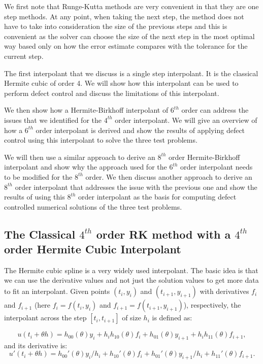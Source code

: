 We first note that Runge-Kutta methods are very convenient in that they are one step methods. At any point, when taking the next step, the method does not have to take into consideration the size of the previous steps and this is convenient as the solver can choose the size of the next step in the most optimal way based only on how the error estimate compares with the tolerance for the current step. 

The first interpolant that we discuss is a single step interpolant. It is the classical Hermite cubic of order 4. We will show how this interpolant can be used to perform defect control and discuss the limitations of this interpolant. 

We then show how a Hermite-Birkhoff interpolant of $6^{th}$ order can address the issues that we identified for the $4^{th}$ order interpolant. We will give an overview of how a $6^{th}$ order interpolant is derived and show the results of applying defect control using this interpolant to solve the three test problems. 

We will then use a similar approach to derive an $8^{th}$ order Hermite-Birkhoff interpolant and show why the approach used for the $6^{th}$ order interpolant needs to be modified for the $8^{th}$ order. We then discuss another approach to derive an $8^{th}$ order interpolant that addresses the issue with the previous one and show the results of using this $8^{th}$ order interpolant as the basis for computing defect controlled numerical solutions of the three test problems.


\subsection{The Classical $4^{th}$ order RK method with a $4^{th}$ order Hermite Cubic Interpolant}
The Hermite cubic spline is a very widely used interpolant. The basic idea is that we can use the derivative values and not just the solution values to get more data to fit an interpolant. Given points $(t_i, y_i)$ and $(t_{i + 1}, y_{i + 1})$ with derivatives $f_i$ and $f_{i + 1}$ (here $f_i = f(t_i, y_i)$ and $f_{i+1}=f(t_{i+1}, y_{i+1})$), respectively, the interpolant across the step $[t_i, t_{i + 1}]$ of size $h_i$ is defined as:

\begin{equation}
\label{eqn:HB4}
u(t_i + \theta h) = h_{00}(\theta)y_i +  h_ih_{10}(\theta)f_i + h_{01}(\theta)y_{i + 1} + h_ih_{11}(\theta)f_{i + 1}, 
\end{equation}
and its derivative is:
\begin{equation}
u'(t_i + \theta h) = h_{00}'(\theta)y_i/h_i +  h_{10}'(\theta)f_i + h_{01}'(\theta)y_{i + 1}/h_i + h_{11}'(\theta)f_{i + 1}. 
\end{equation}

